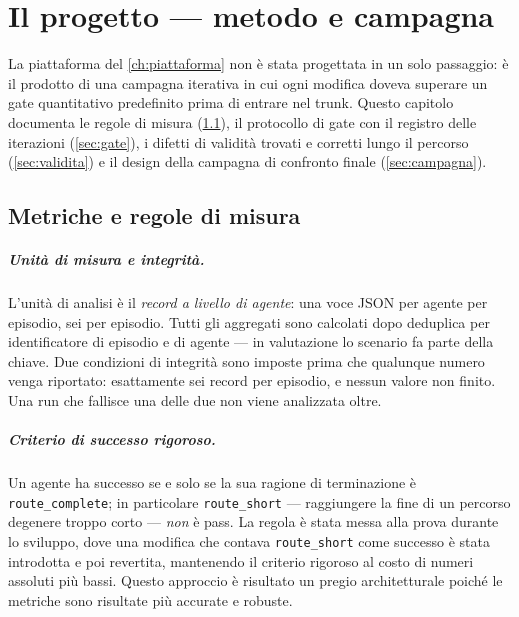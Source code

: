 \chapter{Il progetto --- metodo e campagna}
\label{ch:metodo}

La piattaforma del \cref{ch:piattaforma} non è stata progettata in un
solo passaggio: è il prodotto di una campagna iterativa in cui ogni
modifica doveva superare un gate quantitativo predefinito prima di
entrare nel trunk. Questo capitolo documenta le regole di misura
(\cref{sec:metriche}), il protocollo di gate con il registro delle
iterazioni (\cref{sec:gate}), i difetti di validità trovati e corretti
lungo il percorso (\cref{sec:validita}) e il design della campagna di
confronto finale (\cref{sec:campagna}).

\section{Metriche e regole di misura}
\label{sec:metriche}

\paragraph{Unità di misura e integrità.}
L'unità di analisi è il \emph{record a livello di agente}: una voce JSON
per agente per episodio, sei per episodio. Tutti gli aggregati sono
calcolati dopo deduplica per identificatore di episodio e di agente ---
in valutazione lo scenario fa parte della chiave. Due condizioni di
integrità sono imposte prima che qualunque numero venga riportato:
esattamente sei record per episodio, e nessun valore non finito. Una run
che fallisce una delle due non viene analizzata oltre.

\paragraph{Criterio di successo rigoroso.}
Un agente ha successo se e solo se la sua ragione di terminazione è
\texttt{route\_complete}; in particolare \texttt{route\_short} ---
raggiungere la fine di un percorso degenere troppo corto --- \emph{non}
è pass. La regola è stata messa alla prova durante lo sviluppo, dove
una modifica che contava \texttt{route\_short} come successo è stata
introdotta e poi revertita, mantenendo il criterio rigoroso al costo di
numeri assoluti più bassi. Questo approccio è risultato un pregio architetturale
poiché le metriche sono risultate più accurate e robuste.

